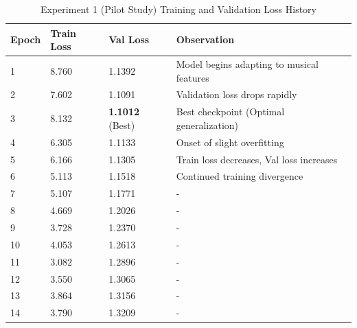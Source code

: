 \documentclass[12pt, conference, letterpaper]{IEEEtran}
\begin{document}
\begin{table}[h]
    \caption{Experiment 1 (Pilot Study) Training and Validation Loss History}
    \label{tab:qwen_loss_history_pilot}
    \centering
    \footnotesize
    \begin{tabular}{lllp{2.4cm}}
        \toprule
        \textbf{Epoch} & \textbf{Train Loss} & \textbf{Val Loss}      & \textbf{Observation}                      \\ \midrule
        1              & 8.760               & 1.1392                 & Model begins adapting to musical features \\
        2              & 7.602               & 1.1091                 & Validation loss drops rapidly             \\
        3              & 8.132               & \textbf{1.1012} (Best) & Best checkpoint (Optimal generalization)  \\
        4              & 6.305               & 1.1133                 & Onset of slight overfitting               \\
        5              & 6.166               & 1.1305                 & Train loss decreases, Val loss increases  \\
        6              & 5.113               & 1.1518                 & Continued training divergence             \\
        7              & 5.107               & 1.1771                 & -                                         \\
        8              & 4.669               & 1.2026                 & -                                         \\
        9              & 3.728               & 1.2370                 & -                                         \\
        10             & 4.053               & 1.2613                 & -                                         \\
        11             & 3.082               & 1.2896                 & -                                         \\
        12             & 3.550               & 1.3065                 & -                                         \\
        13             & 3.864               & 1.3156                 & -                                         \\
        14             & 3.790               & 1.3209                 & -                                         \\

\end{tabular}
\end{table}
\end{document}
